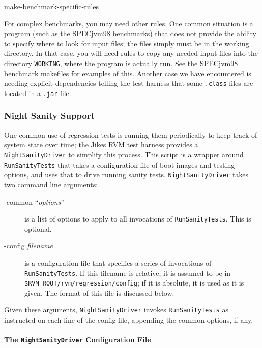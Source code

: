 \begin{description}
\begin{Label}{make-benchmark-specific-rules}
\begin{description}
\end{description}

For complex benchmarks, you may need other rules.  One common
situation is a program (such as the SPECjvm98 benchmarks)
that does not provide the ability to specify where to look for input
files; the files simply must be in the working directory.  In that
case, you will need rules to copy any needed input files into the
directory {\tt WORKING}, where the program is actually run.  See the SPECjvm98
benchmark makefiles for examples of this.  Another case we have
encountered is needing explicit dependencies telling the test harness
that some {\tt .class} files are located in a {\tt .jar} file.
\end{Label}

\end{description}

\subsubsection{Night Sanity Support}
 
One common use of regression tests is running them periodically to
keep track of system state over time; the Jikes RVM test harness
provides a {\tt{NightSanityDriver}} to simplify this process.  This
script is a wrapper around {\tt{RunSanityTests}} that takes a
configuration file of boot images and testing options, and uses that
to drive running sanity tests.  {\tt{NightSanityDriver}} takes two
command line arguments:
\begin{description}
\item[-common ``{\em{options}}''] is a list of options to apply to all
invocations of {\tt{RunSanityTests}}.  This is optional.
\item[-config {\em filename}] is a configuration file that specifies a
series of invocations of {\tt{RunSanityTests}}.  If this filename is
relative, it is assumed to be in {\tt \$RVM\_\-ROOT/rvm/regression/config}; if
it is absolute, it is used as it is given.  The format of this file is
discussed below.
\end{description}

 Given these arguments, {\tt{NightSanityDriver}} invokes
{\tt{RunSanityTests}} as instructed on each line of the config file,
appending the common options, if any.

\paragraph{The \texttt{\textbf{NightSanityDriver}} Configuration File}


